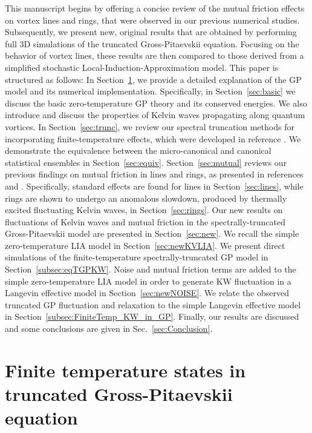 \documentclass[sn-mathphys]{sn-jnl}%
\begin{document}
{This manuscript begins by offering a concise review of the mutual friction effects on vortex lines and rings, that were observed in our previous numerical studies. Subsequently, we present new, original results that are obtained by performing full 3D simulations of the truncated Gross-Pitaevskii equation. Focusing on the behavior of vortex lines, these results are then compared to those derived from a simplified stochastic Local-Induction-Approximation model. This paper} is structured as follows: In Section~\ref{sec:GP}, we provide a detailed explanation of the GP model and its numerical implementation. Specifically, in Section~\ref{sec:basic} we discuss the basic zero-temperature GP theory and its conserved energies. We also introduce and discuss the properties of Kelvin waves propagating along quantum vortices.
%
In Section~\ref{sec:trunc}, we review our spectral truncation methods for incorporating finite-temperature effects, which were developed in reference \cite{Krstulovic11}. We demonstrate the equivalence between the micro-canonical and canonical statistical ensembles in Section~\ref{sec:equiv}. 
%
Section~\ref{sec:mutual} reviews our previous findings on mutual friction in lines and rings, as presented in references \cite{Krstulovic11b} and \cite{Krstulovic11}. Specifically, standard effects are found for lines in Section~\ref{sec:lines}, while rings are shown to undergo an anomalous slowdown, produced by thermally excited fluctuating Kelvin waves, in Section~\ref{sec:rings}. 
%
Our new results on fluctuations of Kelvin waves and mutual friction in the spectrally-truncated Gross-Pitaevskii model are presented in Section~\ref{sec:new}. 
We recall the simple zero-temperature LIA model in Section~\ref{sec:newKVLIA}.
%
We present direct simulations of the finite-temperature spectrally-truncated GP model in Section~\ref{subsec:eqTGPKW}.
%
Noise and mutual friction terms are added to the simple zero-temperature LIA model in order to generate KW fluctuation in a Langevin effective model in  Section~\ref{sec:newNOISE}.
%
We relate the observed truncated GP fluctuation and relaxation to the simple Langevin effective model in Section~\ref{subsec:FiniteTemp_KW_in_GP}.
%
Finally, our results are discussed and some conclusions are given in
Sec.~\ref{sec:Conclusion}.


\section{Finite temperature states in truncated Gross-Pitaevskii equation}\label{sec:GP}
\end{document}
